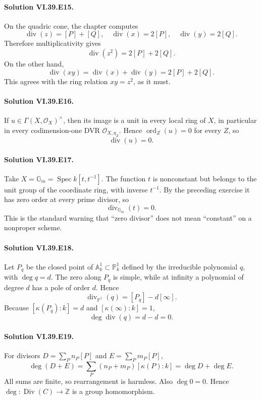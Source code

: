 \paragraph{Solution VI.39.E15.}\label{sol:vi39-e15}
On the quadric cone, the chapter computes
\[
 \operatorname{div}(z)=[P]+[Q],\quad
 \operatorname{div}(x)=2[P],\quad
 \operatorname{div}(y)=2[Q].
\]
Therefore multiplicativity gives
\[
 \operatorname{div}(z^2)=2[P]+2[Q].
\]
On the other hand,
\[
 \operatorname{div}(xy)=\operatorname{div}(x)+\operatorname{div}(y)
 =2[P]+2[Q].
\]
This agrees with the ring relation \(xy=z^2\), as it must.

\paragraph{Solution VI.39.E16.}\label{sol:vi39-e16}
If \(u\in\Gamma(X,\mathcal O_X)^\times\), then its image is a unit in every local ring of \(X\), in particular in every codimension-one DVR \(\mathcal O_{X,\eta_Z}\).  Hence \(\operatorname{ord}_Z(u)=0\) for every \(Z\), so
\[
 \operatorname{div}(u)=0.
\]

\paragraph{Solution VI.39.E17.}\label{sol:vi39-e17}
Take \(X=\mathbb G_m=\operatorname{Spec}k[t,t^{-1}]\).  The function \(t\) is nonconstant but belongs to the unit group of the coordinate ring, with inverse \(t^{-1}\).  By the preceding exercise it has zero order at every prime divisor, so
\[
 \operatorname{div}_{\mathbb G_m}(t)=0.
\]
This is the standard warning that ``zero divisor'' does not mean ``constant'' on a nonproper scheme.

\paragraph{Solution VI.39.E18.}\label{sol:vi39-e18}
Let \(P_q\) be the closed point of \(\mathbb A^1_k\subset\mathbb P^1_k\) defined by the irreducible polynomial \(q\), with \(\deg q=d\).  The zero along \(P_q\) is simple, while at infinity a polynomial of degree \(d\) has a pole of order \(d\).  Hence
\[
 \operatorname{div}_{\mathbb P^1}(q)=[P_q]-d[\infty].
\]
Because \([\kappa(P_q):k]=d\) and \([\kappa(\infty):k]=1\),
\[
 \deg\operatorname{div}(q)=d-d=0.
\]

\paragraph{Solution VI.39.E19.}\label{sol:vi39-e19}
For divisors \(D=\sum_P n_P[P]\) and \(E=\sum_P m_P[P]\),
\[
 \deg(D+E)
 =\sum_P(n_P+m_P)[\kappa(P):k]
 =\deg D+\deg E.
\]
All sums are finite, so rearrangement is harmless.  Also \(\deg 0=0\).  Hence \(\deg:\operatorname{Div}(C)\to\mathbb Z\) is a group homomorphism.

